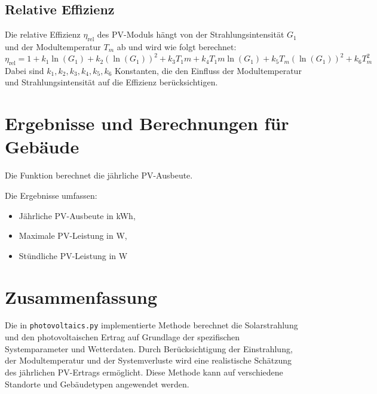 \subsection{Relative Effizienz}
Die relative Effizienz \( \eta_{\text{rel}} \) des PV-Moduls hängt von der Strahlungsintensität \( G_1 \) und der Modultemperatur \( T_m \) ab und wird wie folgt berechnet:
\[
\eta_{\text{rel}} = 1 + k_1 \ln(G_1) + k_2 (\ln(G_1))^2 + k_3 T_1m + k_4 T_1m \ln(G_1) + k_5 T_m (\ln(G_1))^2 + k_6 T_m^2
\]
Dabei sind \( k_1, k_2, k_3, k_4, k_5, k_6 \) Konstanten, die den Einfluss der Modultemperatur und Strahlungsintensität auf die Effizienz berücksichtigen.

\section{Ergebnisse und Berechnungen für Gebäude}
Die Funktion berechnet die jährliche PV-Ausbeute.

Die Ergebnisse umfassen:
\begin{itemize}
    \item Jährliche PV-Ausbeute in kWh,
    \item Maximale PV-Leistung in W,
    \item Stündliche PV-Leistung in W
\end{itemize}

\section{Zusammenfassung}
Die in \texttt{photovoltaics.py} implementierte Methode berechnet die Solarstrahlung und den photovoltaischen Ertrag auf Grundlage der spezifischen Systemparameter und Wetterdaten. Durch Berücksichtigung der Einstrahlung, der Modultemperatur und der Systemverluste wird eine realistische Schätzung des jährlichen PV-Ertrags ermöglicht. Diese Methode kann auf verschiedene Standorte und Gebäudetypen angewendet werden.
